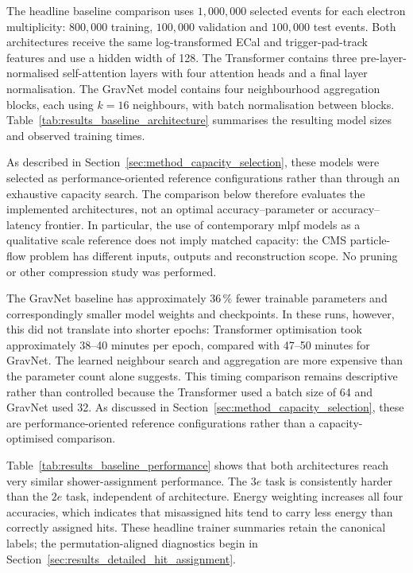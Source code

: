 The headline baseline comparison uses \(1{,}000{,}000\) selected events for
each electron multiplicity: \(800{,}000\) training, \(100{,}000\) validation
and \(100{,}000\) test events.
Both architectures receive the same log-transformed ECal and trigger-pad-track
features and use a hidden width of 128. The Transformer contains three
pre-layer-normalised self-attention layers with four attention heads and a
final layer normalisation. The GravNet model contains four neighbourhood
aggregation blocks, each using \(k=16\) neighbours, with batch normalisation
between blocks. Table~\ref{tab:results_baseline_architecture} summarises the
resulting model sizes and observed training times.



As described in Section~\ref{sec:method_capacity_selection}, these models were
selected as performance-oriented reference configurations rather than through
an exhaustive capacity search. The comparison below therefore evaluates the
implemented architectures, not an optimal accuracy--parameter or
accuracy--latency frontier. In particular, the use of contemporary \gls{mlpf}
models as a qualitative scale reference does not imply matched capacity: the
CMS particle-flow problem has different inputs, outputs and reconstruction
scope. No pruning or other compression study was performed.


The GravNet baseline has approximately \(36\,\%\) fewer trainable parameters
and correspondingly smaller model weights and checkpoints. In these runs,
however, this did not translate into shorter epochs: Transformer optimisation
took approximately 38--40 minutes per epoch, compared with 47--50 minutes for
GravNet. The learned neighbour search and aggregation are more expensive than
the parameter count alone suggests. This timing comparison remains
descriptive rather than controlled because the Transformer used a batch size
of 64 and GravNet used 32. As discussed in
Section~\ref{sec:method_capacity_selection}, these are performance-oriented
reference configurations rather than a capacity-optimised comparison.

Table~\ref{tab:results_baseline_performance} shows that both architectures
reach very similar shower-assignment performance. The \(3e\) task is
consistently harder than the \(2e\) task, independent of architecture. Energy
weighting increases all four accuracies, which indicates that misassigned
hits tend to carry less energy than correctly assigned hits. These headline
trainer summaries retain the canonical labels; the permutation-aligned
diagnostics begin in Section~\ref{sec:results_detailed_hit_assignment}.

